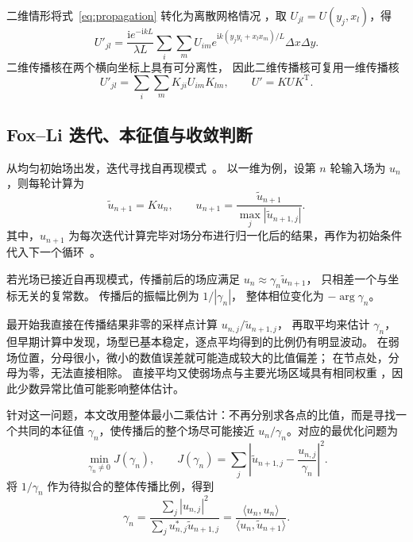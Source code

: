 \documentclass[UTF8,a4paper,12pt]{ctexart}
\begin{document}
二维情形将式~\eqref{eq:propagation} 转化为离散网格情况
，取 \(U_{jl}=U(y_j,x_l)\)，得
\begin{equation}\label{eq:double-sum}
 U'_{jl}=\frac{\mathrm{i}e^{-\mathrm{i}kL}}{\lambda L}
 \sum_i\sum_m U_{im}e^{\mathrm{i}k(y_jy_i+x_lx_m)/L}\Delta x\Delta y.
\end{equation}
二维传播核在两个横向坐标上具有可分离性，
因此二维传播核可复用一维传播核
\begin{equation}\label{eq:matrix-propagation}
 U'_{jl}=\sum_i\sum_m K_{ji}U_{im}K_{lm},
 \qquad U'=KUK^{\mathrm T}.
\end{equation}

\subsection{Fox--Li 迭代、本征值与收敛判断}
从均匀初始场出发，迭代寻找自再现模式~\cite{fox1961resonant}。
以一维为例，设第 \(n\) 轮输入场为 \(u_n\)，则每轮计算为
\begin{equation}
 \widetilde u_{n+1}=Ku_n,\qquad
 u_{n+1}=\frac{\widetilde u_{n+1}}{\max_j|\widetilde u_{n+1,j}|}.
\end{equation}
其中，\(u_{n+1}\) 为每次迭代计算完毕对场分布进行归一化后的结果，再作为初始条件代入下一个循环~\cite{xia2016laser}。

若光场已接近自再现模式，传播前后的场应满足
 \(u_n\approx\gamma_n\widetilde u_{n+1}\)，
只相差一个与坐标无关的复常数。
传播后的振幅比例为 \(1/|\gamma_n|\)，
整体相位变化为 \(-\arg\gamma_n\)。

最开始我直接在传播结果非零的采样点计算 \(u_{n,j}/\widetilde u_{n+1,j}\)，
再取平均来估计 \(\gamma_n\)，
但早期计算中发现，场型已基本稳定，逐点平均得到的比例仍有明显波动。
在弱场位置，分母很小，微小的数值误差就可能造成较大的比值偏差；
在节点处，分母为零，无法直接相除。
直接平均又使弱场点与主要光场区域具有相同权重
，因此少数异常比值可能影响整体估计。

针对这一问题，本文改用整体最小二乘估计：不再分别求各点的比值，而是寻找一个共同的本征值 \(\gamma_n\)，使传播后的整个场尽可能接近 \(u_n/\gamma_n\)。对应的最优化问题为
\begin{equation}
 \min_{\gamma_n\ne0}J(\gamma_n),\qquad
 J(\gamma_n)=\sum_j\left|\widetilde u_{n+1,j}-\frac{u_{n,j}}{\gamma_n}\right|^2.
\end{equation}
将 \(1/\gamma_n\) 作为待拟合的整体传播比例，得到
\begin{equation}\label{eq:gamma}
 \gamma_n=\frac{\sum_j|u_{n,j}|^2}
 {\sum_j u_{n,j}^*\widetilde u_{n+1,j}}
 =\frac{\langle u_n,u_n\rangle}{\langle u_n,\widetilde u_{n+1}\rangle}.
\end{equation}
\end{document}
